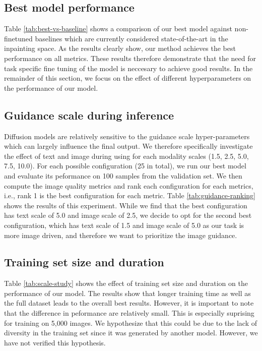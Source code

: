\documentclass[11pt,twocolumn]{article}
\begin{document}
\subsection{Best model performance}
Table \ref{tab:best-vs-baseline} shows a comparison of our best model against non-finetuned baselines which are currently considered state-of-the-art in the inpainting space. 
As the results clearly show, our method achieves the best performance on all metrics. These results therefore demonstrate that
the need for task specific fine tuning of the model is neccesary to achieve good results. In the remainder of this section,
we focus on the effect of different hyperparameters on the performance of our model.


\subsection{Guidance scale during inference}

Diffusion models are relatively sensitive to the guidance scale hyper-parameters which can largely influence the final output.
We therefore specifically investigate the effect of text and image during using for each modality scales (1.5, 2.5, 5.0, 7.5, 10.0). 
For each possible configuration (25 in total), we run our best model and evaluate its peformance on 100 samples from the validation set.
We then compute the image quality metrics and rank each configuration for each metrics, i.e., rank 1 is the best configuration for each metric.
Table \ref{tab:guidance-ranking} shows the results of this experiment. While we find that the best configuration has text scale of 5.0 and image scale of 2.5,
we decide to opt for the second best configuration, which has text scale of 1.5 and image scale of 5.0 as our task is more image driven, and 
therefore we want to prioritize the image guidance.

\subsection{Training set size and duration}

Table \ref{tab:scale-study} shows the effect of training set size and duration on the performance of our model. The results show
that longer training time as well as the full dataset leads to the overall best results. However, it is important to note that
the difference in peformance are relatively small. This is especially suprising for training on 5,000 images. 
We hypothesize that this could be due to the lack of diversity in the training set since it was generated by another model. However,
we have not verified this hypothesis.
\end{document}

